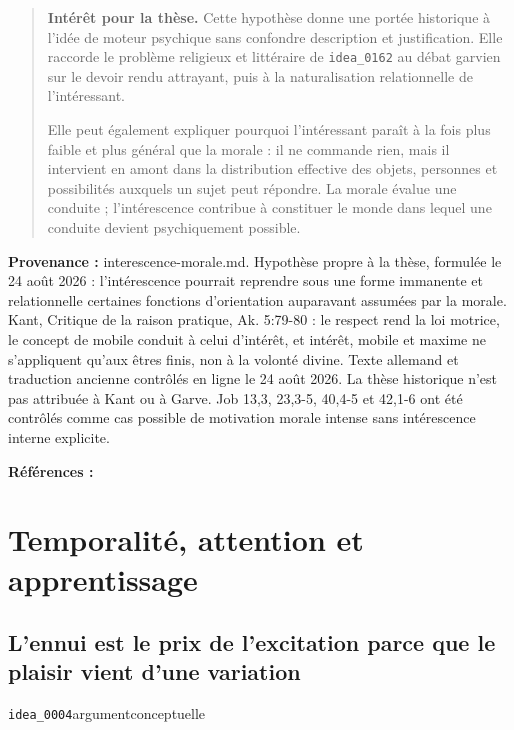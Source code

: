 \documentclass[10pt,a4paper]{article}
\begin{document}
\begin{quote}
\textbf{Intérêt pour la thèse.} Cette hypothèse donne une portée historique à l'idée de moteur psychique sans confondre description et justification. Elle raccorde le problème religieux et littéraire de \texttt{idea\_0162} au débat garvien sur le devoir rendu attrayant, puis à la naturalisation relationnelle de l'intéressant.

Elle peut également expliquer pourquoi l'intéressant paraît à la fois plus faible et plus général que la morale : il ne commande rien, mais il intervient en amont dans la distribution effective des objets, personnes et possibilités auxquels un sujet peut répondre. La morale évalue une conduite ; l'intérescence contribue à constituer le monde dans lequel une conduite devient psychiquement possible.
\end{quote}
{\footnotesize\color{metadata}\textbf{Provenance :} interescence-morale.md. Hypothèse propre à la thèse, formulée le 24 août 2026 : l'intérescence pourrait reprendre sous une forme immanente et relationnelle certaines fonctions d'orientation auparavant assumées par la morale. Kant, Critique de la raison pratique, Ak. 5:79-80 : le respect rend la loi motrice, le concept de mobile conduit à celui d'intérêt, et intérêt, mobile et maxime ne s'appliquent qu'aux êtres finis, non à la volonté divine. Texte allemand et traduction ancienne contrôlés en ligne le 24 août 2026. La thèse historique n'est pas attribuée à Kant ou à Garve. Job 13,3, 23,3-5, 40,4-5 et 42,1-6 ont été contrôlés comme cas possible de motivation morale intense sans intérescence interne explicite.\par}
{\footnotesize\color{metadata}\textbf{Références :} \parencite{kant1848moralepratique,garve1779interessirende,jps1985tanakh}\par}

\section{Temporalité, attention et apprentissage}

\subsection{L'ennui est le prix de l'excitation parce que le plaisir vient d'une variation}
{\small\color{metadata} \texttt{idea\_0004}\quad\textbullet\quad argument\quad\textbullet\quad conceptuelle\par}
\end{document}
